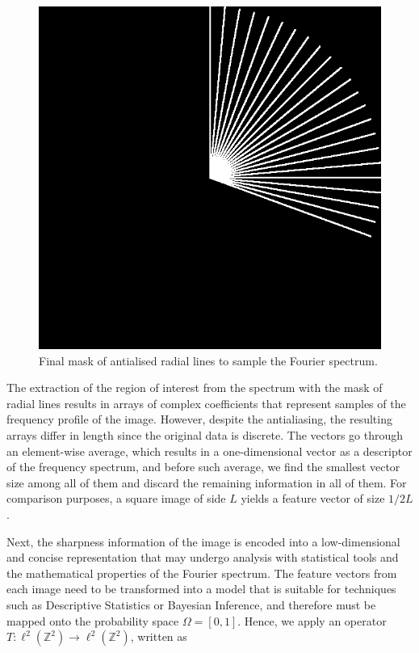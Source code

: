 \begin{figure}[ht]
	\centering
	\caption{Final mask of antialised radial lines to sample the Fourier spectrum.}
	\label{fig:radial_masks}
	\includegraphics[scale=0.5]{images/radial_masks.png}
	\centering
	\fautor
\end{figure}

The extraction of the region of interest from the spectrum with the mask of radial lines results in arrays of complex coefficients that represent samples of the frequency profile of the image. However, despite the antialiasing, the resulting arrays differ in length since the original data is discrete. The vectors go through an element-wise average, which results in a one-dimensional vector as a descriptor of the frequency spectrum, and before such average, we find the smallest vector size among all of them and discard the remaining information in all of them. For comparison purposes, a square image of side $L$ yields a feature vector of size $1 / 2L$.

Next, the sharpness information of the image is encoded into a low-dimensional and concise representation that may undergo analysis with statistical tools and the mathematical properties of the Fourier spectrum. The feature vectors from each image need to be transformed into a model that is suitable for techniques such as Descriptive Statistics or Bayesian Inference, and therefore must be mapped onto the probability space $\Omega = [0,1]$. Hence, we apply an operator $T : \ell^{2}(\mathbb{Z}^{2}) \rightarrow \ell^{2}(\mathbb{Z}^{2})$, written as

